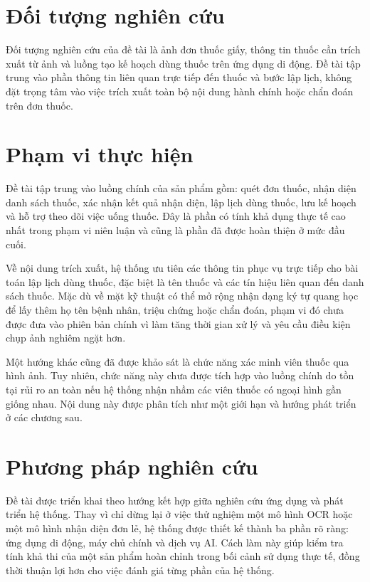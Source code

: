 \documentclass[12pt,a4paper]{report}
\begin{document}
\section{Đối tượng nghiên cứu}

Đối tượng nghiên cứu của đề tài là ảnh đơn thuốc giấy, thông tin thuốc cần trích xuất từ ảnh và luồng tạo kế hoạch dùng thuốc trên ứng dụng di động. Đề tài tập trung vào phần thông tin liên quan trực tiếp đến thuốc và bước lập lịch, không đặt trọng tâm vào việc trích xuất toàn bộ nội dung hành chính hoặc chẩn đoán trên đơn thuốc.

\section{Phạm vi thực hiện}

Đề tài tập trung vào luồng chính của sản phẩm gồm: quét đơn thuốc, nhận diện danh sách thuốc, xác nhận kết quả nhận diện, lập lịch dùng thuốc, lưu kế hoạch và hỗ trợ theo dõi việc uống thuốc. Đây là phần có tính khả dụng thực tế cao nhất trong phạm vi niên luận và cũng là phần đã được hoàn thiện ở mức đầu cuối.

Về nội dung trích xuất, hệ thống ưu tiên các thông tin phục vụ trực tiếp cho bài toán lập lịch dùng thuốc, đặc biệt là tên thuốc và các tín hiệu liên quan đến danh sách thuốc. Mặc dù về mặt kỹ thuật có thể mở rộng nhận dạng ký tự quang học để lấy thêm họ tên bệnh nhân, triệu chứng hoặc chẩn đoán, phạm vi đó chưa được đưa vào phiên bản chính vì làm tăng thời gian xử lý và yêu cầu điều kiện chụp ảnh nghiêm ngặt hơn.

Một hướng khác cũng đã được khảo sát là chức năng xác minh viên thuốc qua hình ảnh. Tuy nhiên, chức năng này chưa được tích hợp vào luồng chính do tồn tại rủi ro an toàn nếu hệ thống nhận nhầm các viên thuốc có ngoại hình gần giống nhau. Nội dung này được phân tích như một giới hạn và hướng phát triển ở các chương sau.

\section{Phương pháp nghiên cứu}

Đề tài được triển khai theo hướng kết hợp giữa nghiên cứu ứng dụng và phát triển hệ thống. Thay vì chỉ dừng lại ở việc thử nghiệm một mô hình OCR hoặc một mô hình nhận diện đơn lẻ, hệ thống được thiết kế thành ba phần rõ ràng: ứng dụng di động, máy chủ chính và dịch vụ AI. Cách làm này giúp kiểm tra tính khả thi của một sản phẩm hoàn chỉnh trong bối cảnh sử dụng thực tế, đồng thời thuận lợi hơn cho việc đánh giá từng phần của hệ thống.
\end{document}
